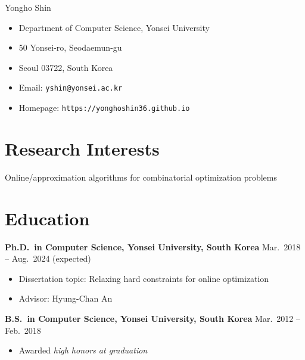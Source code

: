 \documentclass{article}
\newcommand{\killinitspace}{-0.7em}
\begin{document}
{\Huge Yongho Shin}
\begin{itemize}[itemsep=-3pt, leftmargin=2.5pt, label=]
\item Department of Computer Science, Yonsei University
\item 50 Yonsei-ro, Seodaemun-gu
\item Seoul 03722, South Korea
\item Email: \texttt{yshin@yonsei.ac.kr}
\item Homepage: \texttt{https://yonghoshin36.github.io}
\end{itemize}

\section{Research Interests}
Online/approximation algorithms for combinatorial optimization problems

\section{Education}
\textbf{Ph.D.~in Computer Science, Yonsei University, South Korea} \hfill Mar.~2018 -- Aug.~2024 (expected)
\vspace{\killinitspace}
\begin{itemize}
\item Dissertation topic: Relaxing hard constraints for online optimization
\item Advisor: Hyung-Chan An
\end{itemize}

\textbf{B.S.~in Computer Science, Yonsei University, South Korea} \hfill Mar.~2012 -- Feb.~2018
\vspace{\killinitspace}
\begin{itemize}
\item Awarded \textsl{high honors at graduation}
\end{itemize}
\end{document}
